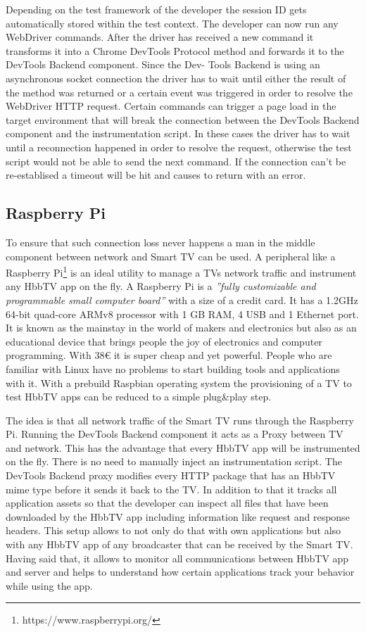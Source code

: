 Depending on the test framework of the developer the session ID gets automatically stored within the test context. The developer can now run any WebDriver commands. After the driver has received a new command it transforms it into a Chrome DevTools Protocol method and forwards it to the DevTools Backend component. Since the Dev- Tools Backend is using an asynchronous socket connection the driver has to wait until either the result of the method was returned or a certain event was triggered in order to resolve the WebDriver HTTP request. Certain commands can trigger a page load in the target environment that will break the connection between the DevTools Backend component and the instrumentation script. In these cases the driver has to wait until a reconnection happened in order to resolve the request, otherwise the test script would not be able to send the next command. If the connection can't be re-establised a timeout will be hit and causes to return with an error.

\subsection{Raspberry Pi\label{sec:pi}}

To ensure that such connection loss never happens a man in the middle component between network and Smart TV can be used. A peripheral like a Raspberry Pi\footnote{https://www.raspberrypi.org/} is an ideal utility to manage a TVs network traffic and instrument any HbbTV app on the fly. A Raspberry Pi is a \textit{''fully customizable and programmable small computer board''}\cite{raspberrypi} with a size of a credit card. It has a 1.2GHz 64-bit quad-core ARMv8 processor with 1 GB RAM, 4 USB and 1 Ethernet port. It is known as the mainstay in the world of makers and electronics but also as an educational device that brings people the joy of electronics and computer programming. With 38\euro{} it is super cheap and yet powerful. People who are familiar with Linux have no problems to start building tools and applications with it. With a prebuild Raspbian operating system the provisioning of a TV to test HbbTV apps can be reduced to a simple plug\&play step.

The idea is that all network traffic of the Smart TV runs through the Raspberry Pi. Running the DevTools Backend component it acts as a Proxy between TV and network. This has the advantage that every HbbTV app will be instrumented on the fly. There is no need to manually inject an instrumentation script. The DevTools Backend proxy modifies every HTTP package that has an HbbTV mime type before it sends it back to the TV. In addition to that it tracks all application assets so that the developer can inspect all files that have been downloaded by the HbbTV app including information like request and response headers. This setup allows to not only do that with own applications but also with any HbbTV app of any broadcaster that can be received by the Smart TV. Having said that, it allows to monitor all communications between HbbTV app and server and helps to understand how certain applications track your behavior while using the app.

